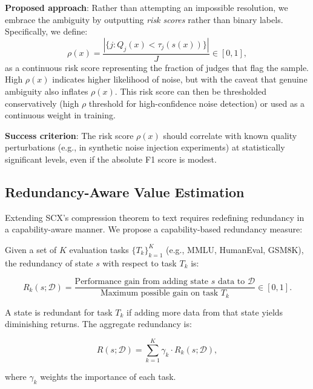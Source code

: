 \documentclass[11pt,twocolumn]{article}
\begin{document}
\textbf{Proposed approach}: Rather than attempting an impossible resolution, we embrace the ambiguity by outputting \textit{risk scores} rather than binary labels. Specifically, we define:
\begin{equation}
\rho(x) = \frac{|\{j: Q_j(x) < \tau_j(s(x))\}|}{J} \in [0, 1],
\label{eq:risk_score}
\end{equation}
as a continuous risk score representing the fraction of judges that flag the sample. High $\rho(x)$ indicates higher likelihood of noise, but with the caveat that genuine ambiguity also inflates $\rho(x)$. This risk score can then be thresholded conservatively (high $\rho$ threshold for high-confidence noise detection) or used as a continuous weight in training.

\textbf{Success criterion}: The risk score $\rho(x)$ should correlate with known quality perturbations (e.g., in synthetic noise injection experiments) at statistically significant levels, even if the absolute F1 score is modest.

\subsection{Redundancy-Aware Value Estimation}
\label{sec:redundancy}

Extending SCX's compression theorem to text requires redefining redundancy in a capability-aware manner. We propose a capability-based redundancy measure:

Given a set of $K$ evaluation tasks $\{T_k\}_{k=1}^K$ (e.g., MMLU, HumanEval, GSM8K), the redundancy of state $s$ with respect to task $T_k$ is:

\begin{equation}
R_k(s; \mathcal{D}) = \frac{\text{Performance gain from adding state $s$ data to $\mathcal{D}$}}{\text{Maximum possible gain on task $T_k$}} \in [0, 1].
\label{eq:capability_redundancy}
\end{equation}

A state is redundant for task $T_k$ if adding more data from that state yields diminishing returns. The aggregate redundancy is:

\begin{equation}
R(s; \mathcal{D}) = \sum_{k=1}^K \gamma_k \cdot R_k(s; \mathcal{D}),
\label{eq:aggregate_redundancy}
\end{equation}

where $\gamma_k$ weights the importance of each task.
\end{document}
